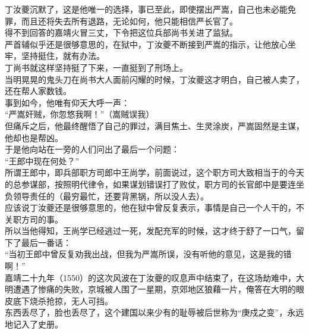 \begin{multicols}{\theparacolNo}
丁汝夔沉默了，这是他唯一的选择，事已至此，即使摆出严嵩，自己也未必能免罪，而且还将失去所有退路，无论如何，他只能相信严长官了。\\

得不到回答的嘉靖火冒三丈，下令把这位兵部尚书关进了监狱。\\

严首辅似乎还是很够意思的，在狱中，丁汝夔不断接到严嵩的指示，让他放心坐牢，坚持挺住，就有办法。\\

丁尚书就这样坚持挺了下来，一直挺到了刑场上。\\

当明晃晃的鬼头刀在尚书大人面前闪耀的时候，丁汝夔这才明白，自己被人卖了，还在帮人家数钱。\\

事到如今，他唯有仰天大呼一声：\\

“严嵩奸贼，你忽悠我啊！”（嵩贼误我）\\

但痛斥之后，他最终醒悟了自己的罪过，满目焦土、生灵涂炭，严嵩固然是主谋，他却也是帮凶。\\

于是他向站在一旁的人们问出了最后一个问题：\\

“王郎中现在何处？”\\

所谓王郎中，即兵部职方司郎中王尚学，前面说过，这个职方司大致相当于的今天的总参谋部，按照明代律令，如果谋划错误打了败仗，职方司的长官郎中是要连坐负领导责任的（最穷最忙，还要背黑锅，所以没人去）。\\

应该说丁汝夔还是很够意思的，他在狱中曾反复表示，事情是自己一个人干的，不关职方司的事。\\

所以当他得知，王尚学已经逃过一死，发配充军的时候，这才终于舒了一口气，留下了最后一番话：\\

“当初王郎中曾反复劝我出战，但我为严嵩所误，没有听他的意见，这是我的错啊！”\\

嘉靖二十九年（1550）的这次风波在丁汝夔的叹息声中结束了，在这场劫难中，大明遭遇了惨痛的失败，京城被人围了一星期，京郊地区狼藉一片，俺答在大明的眼皮底下烧杀抢掠，无人可挡。\\

东西丢尽了，脸也丢尽了，这个建国以来少有的耻辱被后世称为“庚戍之变”，永远地记入了史册。\\


\end{multicols}
